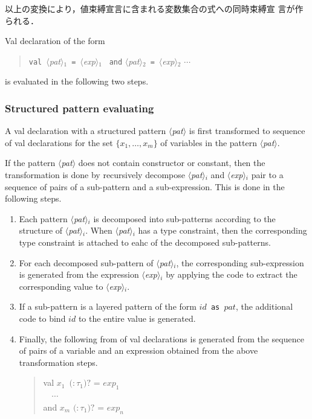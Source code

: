\documentclass{jbook}
\newcommand{\nonterm}[1]{\mbox{$\langle$}{\it #1}\mbox{$\rangle$}}
\newcommand{\term}[1]{\mbox{{\tt #1}}}
\newcommand{\optional}[1]{\mbox{$($}{\protect #1}\mbox{$)?$}}
\newcommand{\myem}{\mbox{\ \ }}
\newenvironment{program}{\begin{quote}\begin{tt}}%
                        {\end{tt}\end{quote}}
\begin{document}
	以上の変換により，値束縛宣言に含まれる変数集合の式への同時束縛宣
言が作られる．

\else%
	Val declaration of the form
\begin{program}
\term{val}\ \nonterm{pat}$_1$\ \term{=}\ \nonterm{exp}$_1$ \ \term{and} \nonterm{pat}$_2$\ \term{=}\ \nonterm{exp}$_2$ $\cdots$
\end{program}
is evaluated in the following two steps.

\subsubsection{Structured pattern evaluating}

	A val declaration with a structured pattern \nonterm{pat} is
first transformed to sequence of val declarations for the set 
$\{x_1,\ldots,x_m\}$ of variables in the pattern \nonterm{pat}.
	
	If the pattern \nonterm{pat} does not contain constructor or
constant, then the transformation is done by recursively decompose 
\nonterm{pat}$_i$ and \nonterm{exp}$_i$ pair to a sequence of pairs of a
sub-pattern and a sub-expression.
	This is done in the following steps.
\begin{enumerate}
\item 
	Each pattern \nonterm{pat}$_i$ is decomposed into sub-patterns
according to the structure of \nonterm{pat}$_i$.
	When \nonterm{pat}$_i$ has a type constraint, then the
corresponding type constraint is attached to eahc of the decomposed
sub-patterns.

\item 
	For each decomposed sub-pattern of \nonterm{pat}$_i$,
the corresponding sub-expression is generated from the expression
\nonterm{exp}$_i$ by applying the code to extract the corresponding
value to \nonterm{exp}$_i$. 

\item 
	If a sub-pattern is a layered pattern of the form
{\tt $id$ as $pat$}, the additional code to bind $id$ to the entire
value is generated.

\item 
	Finally, the following from of val declarations is generated
from the sequence of pairs of a variable and an expression obtained from
the above transformation steps.
\begin{program}
  val $x_1$\ \optional{$:\tau_1$} = $exp_1$\\
  \myem $\cdots$\\
  and $x_m$ \optional{$:\tau_1$} = $exp_n$
\end{program}
\end{enumerate}
\end{document}

